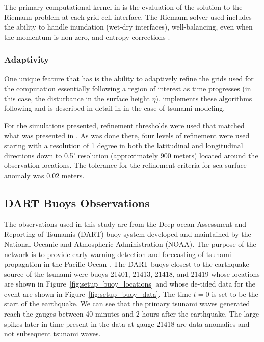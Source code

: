 The primary computational kernel in \geoclaw is the evaluation of the solution to the Riemann problem at each grid cell interface.  The Riemann solver used includes the ability to handle inundation (wet-dry interfaces), well-balancing, even when the momentum is non-zero, and entropy corrections \cite{George:2008aa}.

\subsubsection{Adaptivity} \label{ssub:adaptivity}
One unique feature that \geoclaw has is the ability to adaptively refine the grids used for the computation essentially following a region of interest as time progresses (in this case, the disturbance in the surface height $\eta$).  \geoclaw implements these algorithms following \cite{Berger:1984ui,Berger:1998aa} and is described in detail in \cite{Berger:2011du} in the case of tsunami modeling.

For the simulations presented, refinement thresholds were used that matched what was presented in \cite{MacInnes:2013cr}.  As was done there, four levels of refinement were used staring with a resolution of 1 degree in both the latitudinal and longitudinal directions down to 0.5' resolution (approximately 900 meters) located around the observation locations.  The tolerance for the refinement criteria for sea-surface anomaly was 0.02 meters.

\subsection{DART Buoys Observations}

The observations used in this study are from the Deep-ocean Assessment and
Reporting of Tsunamis (DART) buoy system developed and maintained by the
National Oceanic and Atmospheric Administration (NOAA).  The purpose of the
network is to provide early-warning detection and forecasting of tsunami
propagation in the Pacific Ocean \cite{Milburn:1996wm}.  The DART buoys closest
to the earthquake source of the \tohoku tsunami were buoys 21401, 21413, 21418,
and 21419 whose locations are shown in Figure~\ref{fig:setup_buoy_locations} and
whose de-tided data for the event are shown in Figure~\ref{fig:setup_buoy_data}.
The time $t=0$ is set to be the start of the earthquake.  We can see that the
primary tsunami waves generated reach the gauges between 40 minutes and 2 hours
after the earthquake.  The large spikes later in time present in the data at
gauge 21418 are data anomalies and not subsequent tsunami waves.

